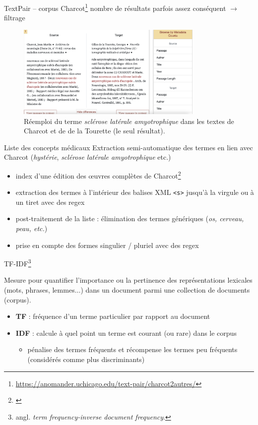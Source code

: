 \begin{frame}{TextPair -- corpus Charcot\footnote{\url{https://anomander.uchicago.edu/text-pair/charcot2autres/}}}
\danger{} nombre de
résultats parfois assez conséquent $\rightarrow$ filtrage
    \begin{figure}[!ht]
        \centering
        \includegraphics[width=90mm,scale=0.5]{pic/textpair.png}
        \caption{Réemploi du terme \textit{sclérose latérale amyotrophique} dans les textes de Charcot et de de la Tourette (le seul résultat).}
        \label{fig:enter-label}
    \end{figure}
\end{frame}

\begin{frame}{Liste des concepts médicaux}
    Extraction semi-automatique des termes en lien avec Charcot (\textit{hystérie}, \textit{sclérose latérale amyotrophique} etc.)
    \begin{itemize}
        \item index d’une édition des œuvres complètes de Charcot\footnote{\cite{charcot1890oeuvres}}
        \item extraction des termes à l'intérieur des balises \textsc{XML} \texttt{<s>} jusqu'à la virgule ou à un tiret avec des regex
        \item post-traitement de la liste : élimination des termes génériques (\textit{os, \textit{cerveau}, \textit{peau}, etc.})
        \item prise en compte des formes singulier / pluriel avec des regex
    \end{itemize}
\end{frame}

\begin{frame}{\textsc{TF-IDF}\footnote{angl. \textit{term frequency-inverse document frequency}.}}

\begin{block}{}
Mesure pour quantifier l'importance ou la pertinence des représentations lexicales (mots, phrases, lemmes$\dots$) dans un document parmi une collection de documents (corpus).
\end{block}
\begin{itemize}
\item \textbf{TF} : fréquence d'un terme particulier par rapport au document
\item \textbf{IDF} : calcule à quel point un terme est courant (ou rare) dans le corpus
\begin{itemize}
\item pénalise des termes fréquents et récompense les termes peu fréquents (considérés comme plus discriminants)
\end{itemize}
\end{itemize}
\end{frame}

